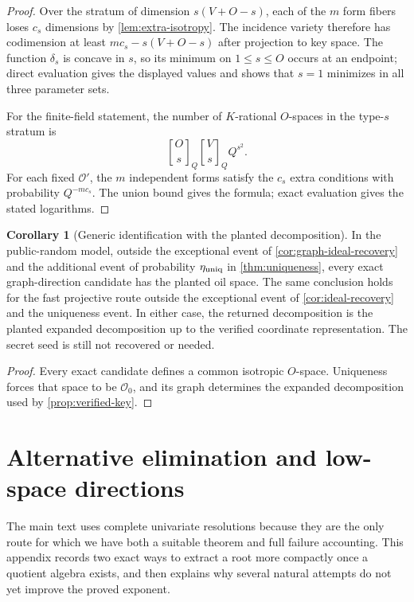 \documentclass[11pt,a4paper]{article}
\theoremstyle{definition}
\newtheorem{corollary}[theorem]{Corollary}
\theoremstyle{remark}
\newcommand{\cO}{\mathcal O}
\begin{document}
\begin{proof}
Over the stratum of dimension $s(V+O-s)$, each of the $m$ form fibers loses $c_s$ dimensions by \cref{lem:extra-isotropy}.  The incidence variety therefore has codimension at least $mc_s-s(V+O-s)$ after projection to key space.  The function $\delta_s$ is concave in $s$, so its minimum on $1\le s\le O$ occurs at an endpoint; direct evaluation gives the displayed values and shows that $s=1$ minimizes in all three parameter sets.

For the finite-field statement, the number of $K$-rational $O$-spaces in the type-$s$ stratum is
\[
\genfrac{[}{]}{0pt}{}{O}{s}_Q
\genfrac{[}{]}{0pt}{}{V}{s}_Q Q^{s^2}.
\]
For each fixed $\cO'$, the $m$ independent forms satisfy the $c_s$ extra conditions with probability $Q^{-mc_s}$.  The union bound gives the formula; exact evaluation gives the stated logarithms.
\end{proof}

\begin{corollary}[Generic identification with the planted decomposition]\label{cor:planted-identification}
In the public-random model, outside the exceptional event of \cref{cor:graph-ideal-recovery} and the additional event of probability $\eta_{\rm uniq}$ in \cref{thm:uniqueness}, every exact graph-direction candidate has the planted oil space.  The same conclusion holds for the fast projective route outside the exceptional event of \cref{cor:ideal-recovery} and the uniqueness event.  In either case, the returned decomposition is the planted expanded decomposition up to the verified coordinate representation.  The secret seed is still not recovered or needed.
\end{corollary}

\begin{proof}
Every exact candidate defines a common isotropic $O$-space.  Uniqueness forces that space to be $\cO_0$, and its graph determines the expanded decomposition used by \cref{prop:verified-key}.
\end{proof}

\section{Alternative elimination and low-space directions}\label{app:alternatives}

The main text uses complete univariate resolutions because they are the only route for which we have both a suitable theorem and full failure accounting.  This appendix records two exact ways to extract a root more compactly once a quotient algebra exists, and then explains why several natural attempts do not yet improve the proved exponent.
\end{document}
